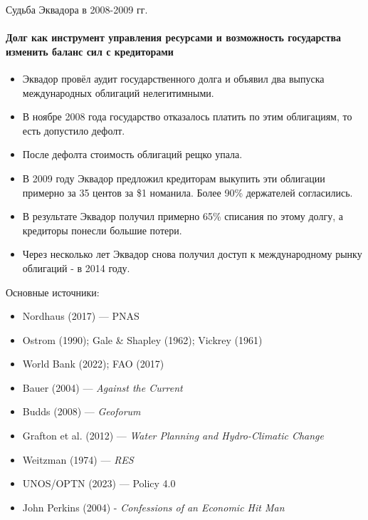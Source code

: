 \documentclass[10pt]{beamer}
\begin{document}
\begin{frame}{Судьба Эквадора в 2008-2009 гг.}
\framesubtitle{Долг как инструмент управления ресурсами и возможность государства изменить баланс сил с кредиторами}
\begin{itemize}
  \item Эквадор провёл аудит государственного долга и объявил два выпуска международных облигаций нелегитимными.
  \item В ноябре 2008 года государство отказалось платить по этим облигациям, то есть допустило дефолт.
  \item После дефолта стоимость облигаций рещко упала.
  \item В 2009 году Эквадор предложил кредиторам выкупить эти облигации примерно за 35 центов за \$1 номанила. Более 90\% держателей согласились.
  \item В результате Эквадор получил примерно 65\% списания по этому долгу, а кредиторы понесли большие потери.
  \item Через несколько лет Эквадор снова получил доступ к международному рынку облигаций - в 2014 году.
\end{itemize}

\end{frame}














\begin{frame}{Основные источники:}
\footnotesize
\begin{itemize}
\item Nordhaus (2017) --- PNAS
\item Ostrom (1990); Gale \& Shapley (1962); Vickrey (1961)
\item World Bank (2022); FAO (2017)
\item Bauer (2004) — \textit{Against the Current}
\item Budds (2008) — \textit{Geoforum}
\item Grafton et al. (2012) — \textit{Water Planning and Hydro-Climatic Change}
\item Weitzman (1974) — \textit{RES}
\item UNOS/OPTN (2023) — Policy 4.0
\item John Perkins (2004) - \textit{Confessions of an Economic Hit Man}
\end{itemize}
\end{frame}
\end{document}
